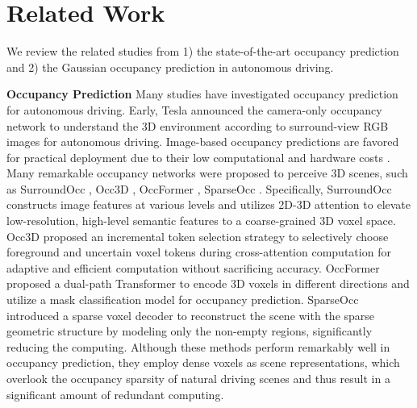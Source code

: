 \documentclass[journal]{IEEEtran}
\begin{document}
\section{Related Work}
\label{sec:related}
We review the related studies from 1) the state-of-the-art occupancy prediction and 2) the Gaussian occupancy prediction in autonomous driving.

\noindent
\textbf{Occupancy Prediction} Many studies have investigated occupancy prediction for autonomous driving.
Early, Tesla announced the camera-only occupancy network to understand the 3D environment 
according to surround-view RGB images for autonomous driving.
Image-based occupancy predictions are favored for practical deployment due to their low computational and hardware costs \cite{zhang2024vision}.
Many remarkable occupancy networks were proposed to perceive 3D scenes, such as SurroundOcc \cite{wei2023surroundocc}, Occ3D \cite{tian2023occ3d}, OccFormer \cite{zhang2023occformer}, SparseOcc \cite{tang2024sparseocc}.
Specifically, SurroundOcc \cite{wei2023surroundocc} constructs image features at various levels and utilizes 2D-3D attention to elevate low-resolution, high-level semantic features to a coarse-grained 3D voxel space.
Occ3D \cite{tian2023occ3d} proposed an incremental token selection strategy to selectively choose foreground and uncertain voxel tokens during cross-attention computation for adaptive and efficient computation without sacrificing accuracy.
OccFormer \cite{zhang2023occformer} proposed a dual-path Transformer to encode 3D voxels in different directions and utilize a mask classification model for occupancy prediction.
SparseOcc \cite{tang2024sparseocc} introduced a sparse voxel decoder to reconstruct the scene with the sparse geometric structure by modeling only the non-empty regions, significantly reducing the computing.
Although these methods perform remarkably well in occupancy prediction, they employ dense voxels as scene representations, which overlook the occupancy sparsity of natural driving scenes and thus result in a significant amount of redundant computing.
\end{document}
